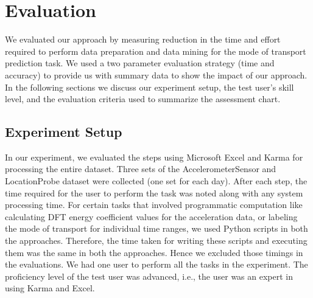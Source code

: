 \section{Evaluation}
We evaluated our approach by measuring reduction in the time and effort required to perform data preparation and data mining for the mode of transport prediction task. We used a two parameter evaluation strategy (time and accuracy) to provide us with summary data to show the impact of our approach. In the following sections we discuss our experiment setup, the test user's skill level, and the evaluation criteria used to summarize the assessment chart. 

\subsection{Experiment Setup}
In our experiment, we evaluated the steps using Microsoft Excel and Karma for processing the entire dataset. Three sets of the AccelerometerSensor and LocationProbe dataset were collected (one set for each day).  After each step, the time required for the user to perform the task was noted along with any system processing time. For certain tasks that involved programmatic computation like calculating DFT energy coefficient values for the acceleration data, or labeling the mode of transport for individual time ranges, we used Python scripts in both the approaches. Therefore, the time taken for writing these scripts and executing them was the same in both the approaches. Hence we excluded those timings in the evaluations. We had one user to perform all the tasks in the experiment. The proficiency level of the test user was advanced, i.e., the user was an expert in using Karma and Excel. 


